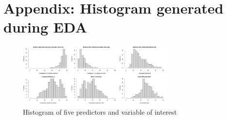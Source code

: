 \documentclass{article}
\begin{document}
\section{Appendix: Histogram generated during EDA}
\label{appendix:hist}
\begin{figure}[!ht]
    \centering
    \includegraphics[width=0.7\textwidth]{EDA.png}
    \caption{\label{fig:}Histogram of five predictors and variable of interest}
\end{figure}
\end{document}

